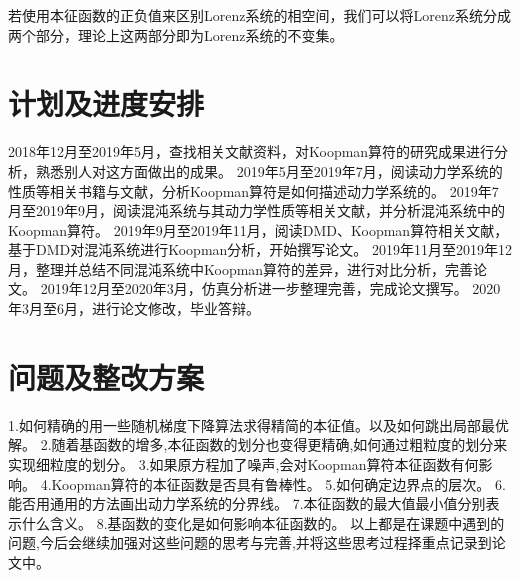  
若使用本征函数的正负值来区别Lorenz系统的相空间，我们可以将Lorenz系统分成两个部分，理论上这两部分即为Lorenz系统的不变集。

\section{计划及进度安排}
2018年12月至2019年5月，查找相关文献资料，对Koopman算符的研究成果进行分析，熟悉别人对这方面做出的成果。
2019年5月至2019年7月，阅读动力学系统的性质等相关书籍与文献，分析Koopman算符是如何描述动力学系统的。
2019年7月至2019年9月，阅读混沌系统与其动力学性质等相关文献，并分析混沌系统中的Koopman算符。
2019年9月至2019年11月，阅读DMD、Koopman算符相关文献，基于DMD对混沌系统进行Koopman分析，开始撰写论文。
2019年11月至2019年12月，整理并总结不同混沌系统中Koopman算符的差异，进行对比分析，完善论文。
2019年12月至2020年3月，仿真分析进一步整理完善，完成论文撰写。
2020年3月至6月，进行论文修改，毕业答辩。

\section{问题及整改方案}
1.如何精确的用一些随机梯度下降算法求得精简的本征值。以及如何跳出局部最优解。
2.随着基函数的增多,本征函数的划分也变得更精确,如何通过粗粒度的划分来实现细粒度的划分。
3.如果原方程加了噪声,会对Koopman算符本征函数有何影响。
4.Koopman算符的本征函数是否具有鲁棒性。
5.如何确定边界点的层次。
6.能否用通用的方法画出动力学系统的分界线。
7.本征函数的最大值最小值分别表示什么含义。
8.基函数的变化是如何影响本征函数的。
以上都是在课题中遇到的问题,今后会继续加强对这些问题的思考与完善,并将这些思考过程择重点记录到论文中。




% 
% 
